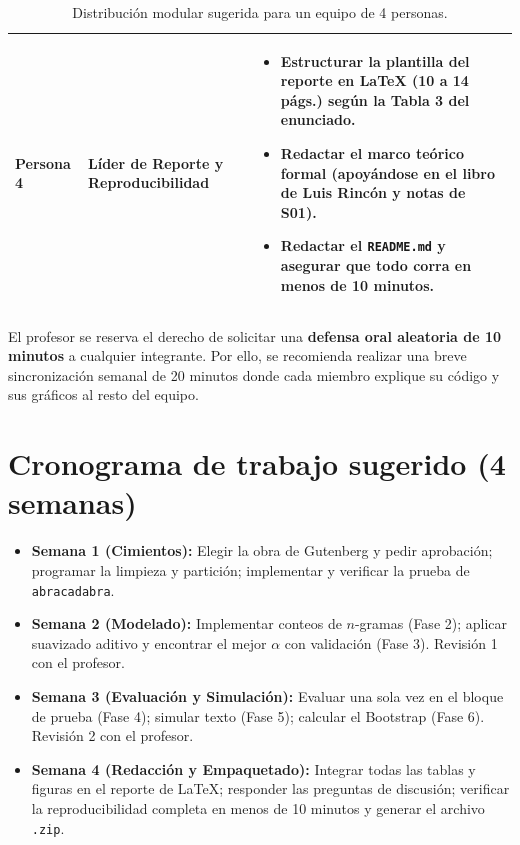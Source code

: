 \documentclass[11pt,letterpaper]{article}
\begin{document}
\begin{table}[H]
\begin{tabularx}{\textwidth}{l p{3.8cm} X}
\addlinespace[3pt]
\textbf{Persona 4} & \textbf{Líder de Reporte y Reproducibilidad} & 
\begin{itemize}[leftmargin=*, nosep]
    \item Estructurar la plantilla del reporte en LaTeX (10 a 14 págs.) según la Tabla 3 del enunciado.
    \item Redactar el marco teórico formal (apoyándose en el libro de Luis Rincón y notas de S01).
    \item Redactar el \texttt{README.md} y asegurar que todo corra en menos de 10 minutos.
\end{itemize} \\
\bottomrule
\end{tabularx}
\caption{Distribución modular sugerida para un equipo de 4 personas.}
\label{tab:roles}
\end{table}

\begin{alertbox}[title=Recomendación clave para la defensa oral]
El profesor se reserva el derecho de solicitar una \textbf{defensa oral aleatoria de 10 minutos} a cualquier integrante. Por ello, se recomienda realizar una breve sincronización semanal de 20 minutos donde cada miembro explique su código y sus gráficos al resto del equipo.
\end{alertbox}

\section{Cronograma de trabajo sugerido (4 semanas)}

\begin{itemize}[leftmargin=1.2cm, itemsep=3pt]
    \item \textbf{Semana 1 (Cimientos):} Elegir la obra de Gutenberg y pedir aprobación; programar la limpieza y partición; implementar y verificar la prueba de \texttt{abracadabra}.
    \item \textbf{Semana 2 (Modelado):} Implementar conteos de $n$-gramas (Fase 2); aplicar suavizado aditivo y encontrar el mejor $\alpha$ con validación (Fase 3). Revisión 1 con el profesor.
    \item \textbf{Semana 3 (Evaluación y Simulación):} Evaluar una sola vez en el bloque de prueba (Fase 4); simular texto (Fase 5); calcular el Bootstrap (Fase 6). Revisión 2 con el profesor.
    \item \textbf{Semana 4 (Redacción y Empaquetado):} Integrar todas las tablas y figuras en el reporte de LaTeX; responder las preguntas de discusión; verificar la reproducibilidad completa en menos de 10 minutos y generar el archivo \texttt{.zip}.
\end{itemize}
\end{document}
